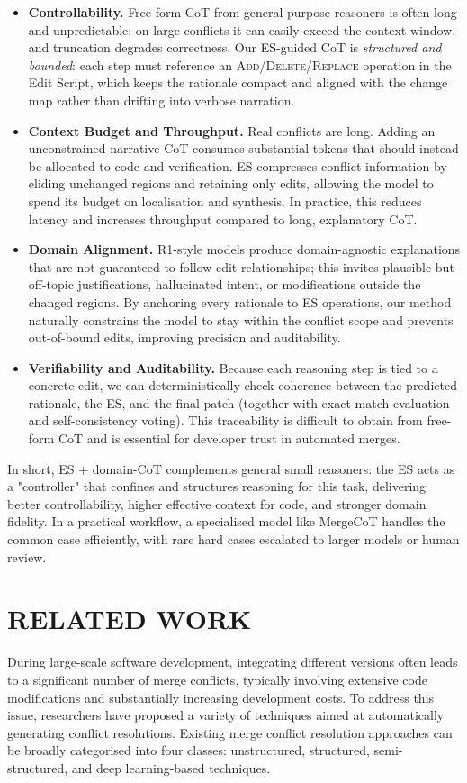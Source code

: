 \documentclass[sigconf,review,anonymous]{acmart}
\begin{document}
\begin{itemize}[leftmargin=*]
    \item \textbf{Controllability.} Free-form CoT from general-purpose reasoners is often long and unpredictable; on large conflicts it can easily exceed the context window, and truncation degrades correctness. Our ES-guided CoT is \emph{structured and bounded}: each step must reference an \textsc{Add}/\textsc{Delete}/\textsc{Replace} operation in the Edit Script, which keeps the rationale compact and aligned with the change map rather than drifting into verbose narration.
    \item \textbf{Context Budget and Throughput.} Real conflicts are long. Adding an unconstrained narrative CoT consumes substantial tokens that should instead be allocated to code and verification. ES compresses conflict information by eliding unchanged regions and retaining only edits, allowing the model to spend its budget on localisation and synthesis. In practice, this reduces latency and increases throughput compared to long, explanatory CoT.
    \item \textbf{Domain Alignment.} R1-style models produce domain-agnostic explanations that are not guaranteed to follow edit relationships; this invites plausible-but-off-topic justifications, hallucinated intent, or modifications outside the changed regions. By anchoring every rationale to ES operations, our method naturally constrains the model to stay within the conflict scope and prevents out-of-bound edits, improving precision and auditability.
    \item \textbf{Verifiability and Auditability.} Because each reasoning step is tied to a concrete edit, we can deterministically check coherence between the predicted rationale, the ES, and the final patch (together with exact-match evaluation and self-consistency voting). This traceability is difficult to obtain from free-form CoT and is essential for developer trust in automated merges.
\end{itemize}

In short, ES + domain-CoT complements general small reasoners: the ES acts as a 
"controller" that confines and structures reasoning for this task, delivering better controllability, higher effective context for code, and stronger domain fidelity. In a practical workflow, a specialised model like MergeCoT handles the common case efficiently, with rare hard cases escalated to larger models or human review.

\section{RELATED WORK}
During large-scale software development, integrating different versions often leads to a significant number of merge conflicts, typically involving extensive code modifications and substantially increasing development costs. To address this issue, researchers have proposed a variety of techniques aimed at automatically generating conflict resolutions. Existing merge conflict resolution approaches can be broadly categorised into four classes: unstructured, structured, semi-structured, and deep learning-based techniques.
\end{document}
